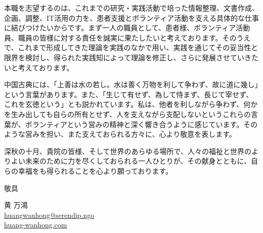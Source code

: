 \documentclass[a4paper,11pt]{article}
\begin{document}
本職を志望するのは、これまでの研究・実践活動で培った情報整理、文書作成、企画、調整、IT活用の力を、患者支援とボランティア活動を支える具体的な仕事に結びつけたいからです。まず一人の職員として、患者様、ボランティア活動員、職員の皆様に対する責任を誠実に果たしたいと考えております。そのうえで、これまで形成してきた理論を実践のなかで用い、実践を通じてその妥当性と限界を検討し、得られた実践知によって理論を修正し、さらに発展させていきたいと考えております。

中国古典には、「上善は水の若し。水は善く万物を利して争わず、故に道に幾し」という言葉があります。また、「生じて有せず、為して恃まず、長じて宰せず、これを玄徳という」とも説かれています。私は、他者を利しながら争わず、何かを生み出しても自らの所有とせず、人を支えながら支配しないというこれらの言葉が、ボランティアという営みの精神と深く響き合うように感じています。そのような営みを担い、また支えておられる方々に、心より敬意を表します。

深秋の十月、貴院の皆様、そして世界のあらゆる場所で、人々の福祉と世界のよりよい未来のために力を尽くしておられる一人ひとりが、その献身とともに、自らの幸福をも得られることを心より願っております。

\noindent\hfill 敬具

\vspace{1pt}
\begin{flushright}
黄 万鴻\\
\href{mailto:huangwanhong@serendip.ngo}{huangwanhong@serendip.ngo}\\
\href{https://huang-wanhong.com}{huang-wanhong.com}
\end{flushright}
\end{document}
